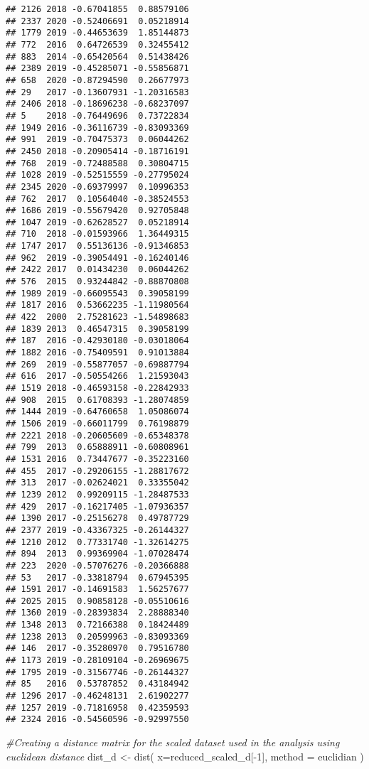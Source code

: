\documentclass[
]{article}
\newenvironment{Shaded}{\begin{snugshade}}{\end{snugshade}}
\newcommand{\AttributeTok}[1]{\textcolor[rgb]{0.77,0.63,0.00}{#1}}
\newcommand{\CommentTok}[1]{\textcolor[rgb]{0.56,0.35,0.01}{\textit{#1}}}
\newcommand{\DecValTok}[1]{\textcolor[rgb]{0.00,0.00,0.81}{#1}}
\newcommand{\FunctionTok}[1]{\textcolor[rgb]{0.00,0.00,0.00}{#1}}
\newcommand{\NormalTok}[1]{#1}
\newcommand{\OtherTok}[1]{\textcolor[rgb]{0.56,0.35,0.01}{#1}}
\newcommand{\SpecialCharTok}[1]{\textcolor[rgb]{0.00,0.00,0.00}{#1}}
\newcommand{\StringTok}[1]{\textcolor[rgb]{0.31,0.60,0.02}{#1}}
\begin{document}
\begin{verbatim}
## 2126 2018 -0.67041855  0.88579106
## 2337 2020 -0.52406691  0.05218914
## 1779 2019 -0.44653639  1.85144873
## 772  2016  0.64726539  0.32455412
## 883  2014 -0.65420564  0.51438426
## 2389 2019 -0.45285071 -0.55856871
## 658  2020 -0.87294590  0.26677973
## 29   2017 -0.13607931 -1.20316583
## 2406 2018 -0.18696238 -0.68237097
## 5    2018 -0.76449696  0.73722834
## 1949 2016 -0.36116739 -0.83093369
## 991  2019 -0.70475373  0.06044262
## 2450 2018 -0.20905414 -0.18716191
## 768  2019 -0.72488588  0.30804715
## 1028 2019 -0.52515559 -0.27795024
## 2345 2020 -0.69379997  0.10996353
## 762  2017  0.10564040 -0.38524553
## 1686 2019 -0.55679420  0.92705848
## 1047 2019 -0.62628527  0.05218914
## 710  2018 -0.01593966  1.36449315
## 1747 2017  0.55136136 -0.91346853
## 962  2019 -0.39054491 -0.16240146
## 2422 2017  0.01434230  0.06044262
## 576  2015  0.93244842 -0.88870808
## 1989 2019 -0.66095543  0.39058199
## 1817 2016  0.53662235 -1.11980564
## 422  2000  2.75281623 -1.54898683
## 1839 2013  0.46547315  0.39058199
## 187  2016 -0.42930180 -0.03018064
## 1882 2016 -0.75409591  0.91013884
## 269  2019 -0.55877057 -0.69887794
## 616  2017 -0.50554266  1.21593043
## 1519 2018 -0.46593158 -0.22842933
## 908  2015  0.61708393 -1.28074859
## 1444 2019 -0.64760658  1.05086074
## 1506 2019 -0.66011799  0.76198879
## 2221 2018 -0.20605609 -0.65348378
## 799  2013  0.65888911 -0.60808961
## 1531 2016  0.73447677 -0.35223160
## 455  2017 -0.29206155 -1.28817672
## 313  2017 -0.02624021  0.33355042
## 1239 2012  0.99209115 -1.28487533
## 429  2017 -0.16217405 -1.07936357
## 1390 2017 -0.25156278  0.49787729
## 2377 2019 -0.43367325 -0.26144327
## 1210 2012  0.77331740 -1.32614275
## 894  2013  0.99369904 -1.07028474
## 223  2020 -0.57076276 -0.20366888
## 53   2017 -0.33818794  0.67945395
## 1591 2017 -0.14691583  1.56257677
## 2025 2015  0.90858128 -0.05510616
## 1360 2019 -0.28393834  2.28888340
## 1348 2013  0.72166388  0.18424489
## 1238 2013  0.20599963 -0.83093369
## 146  2017 -0.35280970  0.79516780
## 1173 2019 -0.28109104 -0.26969675
## 1795 2019 -0.31567746 -0.26144327
## 85   2016  0.53787852  0.43184942
## 1296 2017 -0.46248131  2.61902277
## 1257 2019 -0.71816958  0.42359593
## 2324 2016 -0.54560596 -0.92997550
\end{verbatim}

\begin{Shaded}
\begin{Highlighting}[]
\CommentTok{\#Creating a distance matrix for the scaled dataset used in the analysis using euclidean distance}
\NormalTok{dist\_d }\OtherTok{\textless{}{-}} \FunctionTok{dist}\NormalTok{(}
  \AttributeTok{x=}\NormalTok{reduced\_scaled\_d[}\SpecialCharTok{{-}}\DecValTok{1}\NormalTok{],}
  \AttributeTok{method =} \StringTok{\textquotesingle{}euclidian\textquotesingle{}}
\NormalTok{)}
\end{Highlighting}
\end{Shaded}
\end{document}
